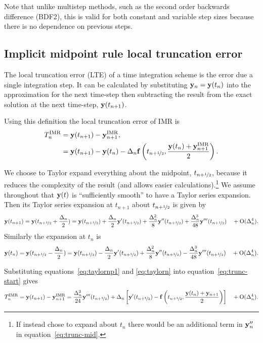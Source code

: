 Note that unlike multistep methods, such as the second order backwards difference (BDF2), this is valid for both constant and variable step sizes because there is no dependence on previous steps.


\subsection{Implicit midpoint rule local truncation error}
\label{sec:deriv-local-trunc}

The local truncation error (LTE) of a time integration scheme is the error due a single integration step.
It can be calculated by substituting $\mathbf{y}_n = \mathbf{y}(t_n)$ into the approximation for the next time-step then subtracting the result from the exact solution at the next time-step, $\mathbf{y}(t_{n+1})$.

Using this definition the local truncation error of IMR is
\begin{align}
  \lte^\IMP &= \yv(t_{n+1}) - \yv_{n+1}^\IMP, \notag\\
  &= \yv(t_{n+1}) - \yv(t_n) - \dtn \fv\left( \thf, \frac{\yv(t_n) + \yv_{n+1}^\IMP}{2} \right).
  \label{eq:trunc-start}
\end{align}

We choose to Taylor expand everything about the midpoint, $t_{n+\nicefrac{1}{2}}$, because it reduces the complexity of the result (and allows easier calculations).\footnote{If instead chose to expand about $t_n$ there would be an additional term in $\mathbf{y}_n''$ in equation~\eqref{eq:trunc-mid}.}
We assume throughout that $\mathbf{y}(t)$ is ``sufficiently smooth'' to have a Taylor series expansion. Then its Taylor series expansion at $t_{n+1}$ about $t_{n+\nicefrac{1}{2}}$ is given by
\begin{equation}
  \yv(t_{n+1}) = \yv(\thf + \frac{\dtn}{2}) = \yvhf + \frac{\dtn}{2} \yvhf['] + \frac{\dtn^2}{8} \yvhf[''] + \frac{\dtn^3}{48} \yvhf['''] \porder{\dtn^4}.
  \label{eq:taylornp1}
\end{equation}
Similarly the expansion at $t_n$ is
\begin{equation}
  \yv(t_n) = \yv(\thf - \frac{\dtn}{2}) = \yvhf - \frac{\dtn}{2} \yvhf['] + \frac{\dtn^2}{8} \yvhf[''] - \frac{\dtn^3}{48} \yvhf['''] \porder{\dtn^4}.
  \label{eq:taylorn}
\end{equation}

Substituting equations~\eqref{eq:taylornp1} and \eqref{eq:taylorn} into equation~\eqref{eq:trunc-start} gives
\begin{equation}
  \lte^\IMP = \yv(t_{n+1}) - \yv_{n+1}^\IMP
  = \frac{\dtn^3}{24} \yvhf[''']  + \dtn  \left[ \yvhf[']
  - \fv\left( \thf, \frac{\yv(t_n) + \yv_{n+1}}{2} \right) \right]  \porder{\dtn^4}.
  \label{eq:trunc-mid}
\end{equation}

